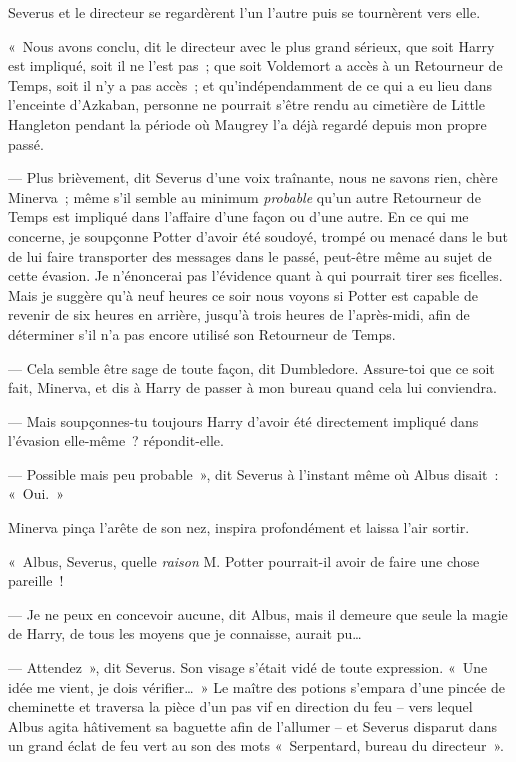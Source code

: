 Severus et le directeur se regardèrent l'un l'autre puis se tournèrent vers elle.

«~Nous avons conclu, dit le directeur avec le plus grand sérieux, que soit Harry est impliqué, soit il ne l'est pas~; que soit Voldemort a accès à un Retourneur de Temps, soit il n'y a pas accès~; et qu'indépendamment de ce qui a eu lieu dans l'enceinte d'Azkaban, personne ne pourrait s'être rendu au cimetière de Little Hangleton pendant la période où Maugrey l'a déjà regardé depuis mon propre passé.

--- Plus brièvement, dit Severus d'une voix traînante, nous ne savons rien, chère Minerva~; même s'il semble au minimum \emph{probable} qu'un autre Retourneur de Temps est impliqué dans l'affaire d'une façon ou d'une autre. En ce qui me concerne, je soupçonne Potter d'avoir été soudoyé, trompé ou menacé dans le but de lui faire transporter des messages dans le passé, peut-être même au sujet de cette évasion. Je n'énoncerai pas l'évidence quant à qui pourrait tirer ses ficelles. Mais je suggère qu'à neuf heures ce soir nous voyons si Potter est capable de revenir de six heures en arrière, jusqu'à trois heures de l'après-midi, afin de déterminer s'il n'a pas encore utilisé son Retourneur de Temps.

--- Cela semble être sage de toute façon, dit Dumbledore. Assure-toi que ce soit fait, Minerva, et dis à Harry de passer à mon bureau quand cela lui conviendra.

--- Mais soupçonnes-tu toujours Harry d'avoir été directement impliqué dans l'évasion elle-même~? répondit-elle.

--- Possible mais peu probable~», dit Severus à l'instant même où Albus disait~: «~Oui.~»

Minerva pinça l'arête de son nez, inspira profondément et laissa l'air sortir.

«~Albus, Severus, quelle \emph{raison} M. Potter pourrait-il avoir de faire une chose pareille~!

--- Je ne peux en concevoir aucune, dit Albus, mais il demeure que seule la magie de Harry, de tous les moyens que je connaisse, aurait pu…

--- Attendez~», dit Severus. Son visage s'était vidé de toute expression. «~Une idée me vient, je dois vérifier…~» Le maître des potions s'empara d'une pincée de cheminette et traversa la pièce d'un pas vif en direction du feu -- vers lequel Albus agita hâtivement sa baguette afin de l'allumer -- et Severus disparut dans un grand éclat de feu vert au son des mots «~Serpentard, bureau du directeur~».

